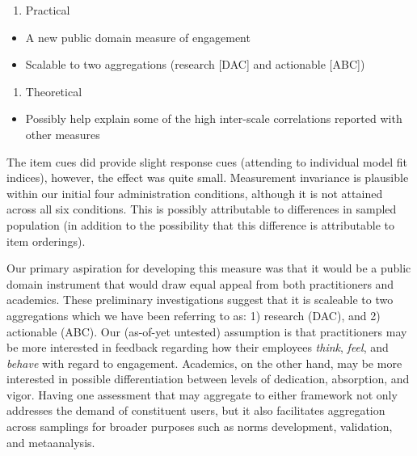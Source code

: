 \documentclass[
  man]{apa6}
\providecommand{\tightlist}{%
  \setlength{\itemsep}{0pt}\setlength{\parskip}{0pt}}
\begin{document}
\begin{enumerate}
\def\labelenumi{\arabic{enumi}.}
\setcounter{enumi}{1}
\tightlist
\item
  Practical
\end{enumerate}

\begin{itemize}
\tightlist
\item
  A new public domain measure of engagement
\item
  Scalable to two aggregations (research {[}DAC{]} and actionable {[}ABC{]})
\end{itemize}

\begin{enumerate}
\def\labelenumi{\arabic{enumi}.}
\setcounter{enumi}{2}
\tightlist
\item
  Theoretical
\end{enumerate}

\begin{itemize}
\tightlist
\item
  Possibly help explain some of the high inter-scale correlations reported with other measures
\end{itemize}

The item cues did provide slight response cues (attending to individual model fit indices), however, the effect was quite small. Measurement invariance is plausible within our initial four administration conditions, although it is not attained across all six conditions. This is possibly attributable to differences in sampled population (in addition to the possibility that this difference is attributable to item orderings).

Our primary aspiration for developing this measure was that it would be a public domain instrument that would draw equal appeal from both practitioners and academics. These preliminary investigations suggest that it is scaleable to two aggregations which we have been referring to as: 1) research (DAC), and 2) actionable (ABC). Our (as-of-yet untested) assumption is that practitioners may be more interested in feedback regarding how their employees \emph{think}, \emph{feel}, and \emph{behave} with regard to engagement. Academics, on the other hand, may be more interested in possible differentiation between levels of dedication, absorption, and vigor. Having one assessment that may aggregate to either framework not only addresses the demand of constituent users, but it also facilitates aggregation across samplings for broader purposes such as norms development, validation, and metaanalysis.
\end{document}
